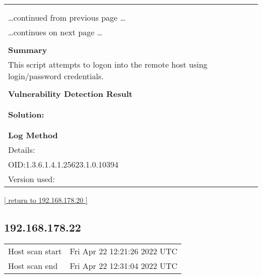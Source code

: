 \documentclass{article}
\begin{document}
\begin{longtable}{|p{}|}
\hline
\rowcolor{gvm_log}{\color{white}{Log (CVSS: 0.0) }}\\
\rowcolor{gvm_log}{\color{white}{NVT: SMB log in}}\\
\hline
\endfirsthead
\hfill\ldots continued from previous page \ldots \\
\hline
\endhead
\hline
\ldots continues on next page \ldots \\
\endfoot
\hline
\endlastfoot
\\
\textbf{Summary}\\
This script attempts to logon into the remote host using
  login/password credentials.\\

        \hline
        \\
\textbf{Vulnerability Detection Result}\\
\rowcolor{white}{\verb=It was possible to log into the remote host using the SMB protocol.=}\\

          \hline
          \\
\textbf{Solution:}\\
\\


        \hline
        \\
\textbf{Log Method}\\
Details:
\rowcolor{white}{\verb=SMB log in=}\\
OID:1.3.6.1.4.1.25623.1.0.10394\\
Version used:
\rowcolor{white}{\verb=2021-08-11T09:39:10Z=}\\
\end{longtable}

\begin{footnotesize}\hyperref[host:192.168.178.20]{[ return to 192.168.178.20 ]}\end{footnotesize}
\subsection{192.168.178.22}
\label{host:192.168.178.22}

\begin{tabular}{ll}
Host scan start&Fri Apr 22 12:21:26 2022 UTC\\
Host scan end&Fri Apr 22 12:31:04 2022 UTC\\
\end{tabular}
\end{document}
